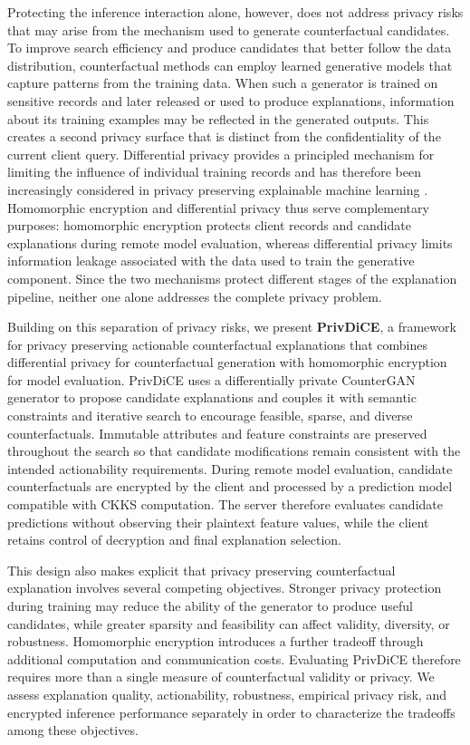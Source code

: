 \documentclass[preprint,12pt]{elsarticle}
\begin{document}
Protecting the inference interaction alone, however, does not address privacy
risks that may arise from the mechanism used to generate counterfactual
candidates. To improve search efficiency and produce candidates that better
follow the data distribution, counterfactual methods can employ learned generative models that capture patterns from the training data. When such a generator is trained on sensitive records and later released or used to produce
explanations, information about its training examples may be reflected in the
generated outputs. This creates a second privacy surface that is distinct from
the confidentiality of the current client query. Differential privacy provides
a principled mechanism for limiting the influence of individual training records and has therefore been increasingly considered in privacy preserving explainable machine learning
\cite{saifullah2022privacy,allana2026petxai}. Homomorphic encryption and differential privacy thus serve complementary purposes: homomorphic encryption protects client records and candidate explanations during remote model evaluation, whereas differential privacy limits information leakage associated with the data used to train the generative component. Since the two mechanisms protect different stages of the explanation pipeline, neither one alone
addresses the complete privacy problem.

Building on this separation of privacy risks, we present \textbf{PrivDiCE}, a
framework for privacy preserving actionable counterfactual explanations that
combines differential privacy for counterfactual generation with homomorphic
encryption for model evaluation. PrivDiCE uses a differentially private
CounterGAN generator to propose candidate explanations and couples it with
semantic constraints and iterative search to encourage feasible, sparse, and
diverse counterfactuals. Immutable attributes and feature constraints are
preserved throughout the search so that candidate modifications remain
consistent with the intended actionability requirements. During remote model
evaluation, candidate counterfactuals are encrypted by the client and processed
by a prediction model compatible with CKKS computation. The server therefore
evaluates candidate predictions without observing their plaintext feature
values, while the client retains control of decryption and final explanation
selection.

This design also makes explicit that privacy preserving counterfactual
explanation involves several competing objectives. Stronger privacy protection
during training may reduce the ability of the generator to produce useful
candidates, while greater sparsity and feasibility can affect validity,
diversity, or robustness. Homomorphic encryption introduces a further tradeoff
through additional computation and communication costs. Evaluating PrivDiCE
therefore requires more than a single measure of counterfactual validity or
privacy. We assess explanation quality, actionability, robustness, empirical
privacy risk, and encrypted inference performance separately in order to
characterize the tradeoffs among these objectives.
\end{document}
